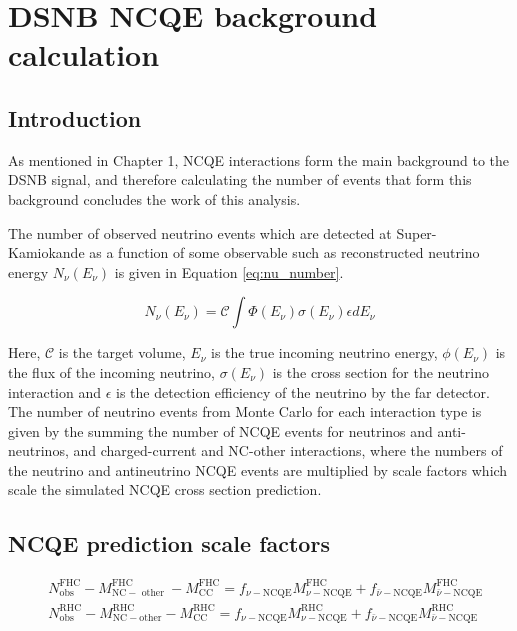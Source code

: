 \chapter{DSNB NCQE background calculation}
\label{chp:ncqe_xsec}


\section{Introduction}

As mentioned in Chapter 1, NCQE interactions form the main background to the DSNB signal, and therefore calculating the number of events that form this background concludes the work of this analysis. 

The number of observed neutrino events which are detected at Super-Kamiokande as a function of some observable such as reconstructed neutrino energy $N_{\nu}(E_{\nu})$ is given in Equation \ref{eq:nu_number}.

\begin{equation}
    N_\nu(E_\nu)=\mathcal{C} \int \Phi\left(E_\nu\right) \sigma\left(E_\nu\right) \epsilon d E_\nu
\label{eq:nu_number}
\end{equation}

Here, $\mathcal{C}$ is the target volume, $E_{\nu}$ is the true incoming neutrino energy, $\phi(E_{\nu})$ is the flux of the incoming neutrino, $\sigma(E_{\nu})$ is the cross section for the neutrino interaction and $\epsilon$ is the detection efficiency of the neutrino by the far detector. The number of neutrino events from Monte Carlo for each interaction type is given by the summing the number of NCQE events for neutrinos and anti-neutrinos, and charged-current and NC-other interactions, where the numbers of the neutrino and antineutrino NCQE events are multiplied by scale factors which scale the simulated NCQE cross section prediction.


\section{NCQE prediction scale factors}



 \begin{equation}
    \begin{aligned}
    & N_{\mathrm{obs}}^{\mathrm{FHC}}-M_{\mathrm{NC}-\text { other }}^{\mathrm{FHC}}-M_{\mathrm{CC}}^{\mathrm{FHC}}=f_{\nu-\mathrm{NCQE}} M_{\nu-\mathrm{NCQE}}^{\mathrm{FHC}}+f_{\bar{\nu}-\mathrm{NCQE}} M_{\bar{\nu}-\mathrm{NCQE}}^{\mathrm{FHC}} \\
    & N_{\mathrm{obs}}^{\mathrm{RHC}}-M_{\mathrm{NC}-\mathrm{other}}^{\mathrm{RHC}}-M_{\mathrm{CC}}^{\mathrm{RHC}}=f_{\nu-\mathrm{NCQE}} M_{\nu-\mathrm{NCQE}}^{\mathrm{RHC}}+f_{\bar{\nu}-\mathrm{NCQE}} M_{\bar{\nu}-\mathrm{NCQE}}^{\mathrm{RHC}}
    \end{aligned}
\label{eq:scale_factor_mode}
\end{equation}


